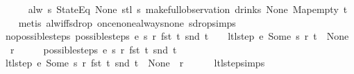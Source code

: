 \begin{isabellebody}
\ \ \ \ \isamarkupfalse%
%
\endisatagproof
{\isafoldproof}%
%
\isadelimproof
\isanewline
%
\endisadelimproof
\isanewline
\isanewline
{}\isamarkupfalse%
\ {\isachardoublequoteopen}alw\ {\isacharparenleft}{\isasymlambda}s{\isachardot}\ StateEq\ None\ {\isacharparenleft}stl\ s{\isacharparenright}{\isacharparenright}\ {\isacharparenleft}make{\isacharunderscore}full{\isacharunderscore}observation\ drinks\ None\ Map{\isachardot}empty\ t{\isacharparenright}{\isachardoublequoteclose}\isanewline
%
\isadelimproof
\ \ %
\endisadelimproof
%
\isatagproof
{}\isamarkupfalse%
\ {\isacharparenleft}metis\ alw{\isacharunderscore}iff{\isacharunderscore}sdrop\ once{\isacharunderscore}none{\isacharunderscore}always{\isacharunderscore}none\ sdrop{\isacharunderscore}simps{\isacharparenleft}{}{\isacharparenright}{\isacharparenright}%
\endisatagproof
{\isafoldproof}%
%
\isadelimproof
\isanewline
%
\endisadelimproof
\isanewline
{}\isamarkupfalse%
\ no{\isacharunderscore}possible{\isacharunderscore}steps{\isacharcolon}\ {\isachardoublequoteopen}possible{\isacharunderscore}steps\ e\ s\ r\ {\isacharparenleft}fst\ t{\isacharparenright}\ {\isacharparenleft}snd\ t{\isacharparenright}\ {\isacharequal}\ {\isacharbraceleft}{\isacharbar}{\isacharbar}{\isacharbraceright}\ {\isasymLongrightarrow}\ ltl{\isacharunderscore}step\ e\ {\isacharparenleft}Some\ s{\isacharparenright}\ r\ t\ {\isacharequal}\ {\isacharparenleft}None{\isacharcomma}\ {\isacharbrackleft}{\isacharbrackright}{\isacharcomma}\ r{\isacharparenright}{\isachardoublequoteclose}\isanewline
%
\isadelimproof
%
\endisadelimproof
%
\isatagproof
{}\isamarkupfalse%
\ {\isacharminus}\isanewline
\ \ \isamarkupfalse%
\ {\isachardoublequoteopen}possible{\isacharunderscore}steps\ e\ s\ r\ {\isacharparenleft}fst\ t{\isacharparenright}\ {\isacharparenleft}snd\ t{\isacharparenright}\ {\isacharequal}\ {\isacharbraceleft}{\isacharbar}{\isacharbar}{\isacharbraceright}{\isachardoublequoteclose}\isanewline
\ \ \isamarkupfalse%
\ \isamarkupfalse%
\ {\isachardoublequoteopen}ltl{\isacharunderscore}step\ e\ {\isacharparenleft}Some\ s{\isacharparenright}\ r\ {\isacharparenleft}fst\ t{\isacharcomma}\ snd\ t{\isacharparenright}\ {\isacharequal}\ {\isacharparenleft}None{\isacharcomma}\ {\isacharbrackleft}{\isacharbrackright}{\isacharcomma}\ r{\isacharparenright}{\isachardoublequoteclose}\isanewline
\ \ \ \ \isamarkupfalse%
\ ltl{\isacharunderscore}step{\isachardot}simps{\isacharparenleft}{}{\isacharparenright}\ \isamarkupfalse%

\end{isabellebody}
